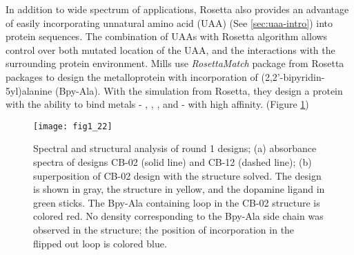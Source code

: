 \begin{refsection}
In addition to wide spectrum of applications, Rosetta also provides an
advantage of easily incorporating unnatural amino acid (UAA) (See
\ref{sec:uaa-intro}) into protein sequences. The combination of UAAs with
Rosetta algorithm allows control over both mutated location of the UAA, and the
interactions with the surrounding protein environment\cite{Renfrew2012b}. Mills
 use \emph{RosettaMatch} package from Rosetta packages to design
the metalloprotein with incorporation of (2,2’-bipyridin-5yl)alanine
(Bpy-Ala)\cite{Mills2013}. With the simulation from Rosetta, they design a
protein with the ability to bind metals - , ,
, and  - with high affinity. (Figure \ref{fig:rosetta-uaa})
\begin{figure}[h!] \centering \texttt{[image: fig1\_22]}
    \caption[Spectral and structural analysis of round 1 designs; (a)
        absorbance spectra of designs CB-02 (solid line) and CB-12 (dashed
        line); (b) superposition of CB-02 design with the structure solved. The
        design is shown in gray, the structure in yellow, and the dopamine
        ligand in green sticks. The Bpy-Ala containing loop in the CB-02
        structure is colored red. No density corresponding to the Bpy-Ala side
        chain was observed in the structure; the position of incorporation in
    the flipped out loop is colored blue.] {Spectral and structural analysis of
        round 1 designs; (a) absorbance spectra of designs CB-02 (solid line)
        and CB-12 (dashed line); (b) superposition of CB-02 design with the
        structure solved. The design is shown in gray, the structure in yellow,
        and the dopamine ligand in green sticks. The Bpy-Ala containing loop in
        the CB-02 structure is colored red. No density corresponding to the
        Bpy-Ala side chain was observed in the structure; the position of
        incorporation in the flipped out loop is colored blue\cite{Mills2013}.}
        \label{fig:rosetta-uaa} 
\end{figure}


\end{refsection}
